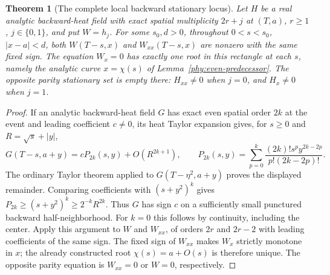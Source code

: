 \documentclass[11pt]{article}
\numberwithin{equation}{section}
\newtheorem{theorem}{Theorem}[section]
\theoremstyle{definition}
\theoremstyle{remark}
\begin{document}
\begin{theorem}[The complete local backward stationary locus]
\label{phy:complete-stationary-locus}
Let $H$ be a real analytic backward-heat field with exact spatial
multiplicity $2r+j$ at $(T,a)$, $r\ge1$, $j\in\{0,1\}$, and put $W=h_j$.
For some $s_0,d>0$, throughout
$0<s<s_0$, $|x-a|<d$, both $W(T-s,x)$ and $W_{xx}(T-s,x)$
are nonzero with the same fixed sign. The equation $W_x=0$ has
exactly one root in this rectangle at each $s$, namely the analytic
curve $x=\chi(s)$ of Lemma~\ref{phy:even-predecessor}.
The opposite parity stationary set is empty there: $H_{xx}\ne0$
when $j=0$, and $H_x\ne0$ when $j=1$.
\end{theorem}
\begin{proof}
If an analytic backward-heat field $G$ has exact even spatial order
$2k$ at the event and leading coefficient $c\ne0$, its heat Taylor
expansion gives, for $s\ge0$ and $R=\sqrt{s}+|y|$,
\[
 G(T-s,a+y)=cP_{2k}(s,y)+O(R^{2k+1}),\qquad
 P_{2k}(s,y)=\sum_{p=0}^k\frac{(2k)!s^py^{2k-2p}}{p!(2k-2p)!}.
\]
The ordinary Taylor theorem applied to $G(T-\eta^2,a+y)$ proves
the displayed remainder. Comparing coefficients with $(s+y^2)^k$
gives $P_{2k}\ge(s+y^2)^k\ge2^{-k}R^{2k}$.
Thus $G$ has sign $c$ on a sufficiently small punctured backward
half-neighborhood. For $k=0$ this follows by continuity, including
the center. Apply this argument to $W$ and $W_{xx}$, of orders
$2r$ and $2r-2$ with leading coefficients of the same sign.
The fixed sign of $W_{xx}$ makes $W_x$ strictly monotone in $x$;
the already constructed root $\chi(s)=a+O(s)$ is therefore unique.
The opposite parity equation is $W_{xx}=0$ or $W=0$, respectively.
\end{proof}
\end{document}
